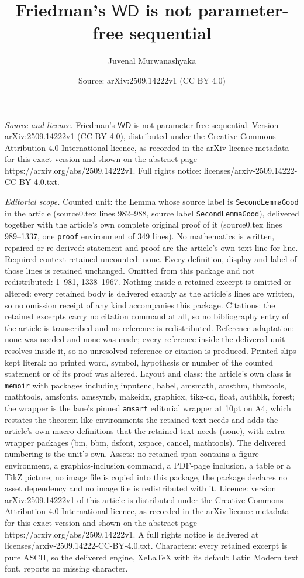 \documentclass[10pt,a4paper]{amsart}
\title[Friedman's $ \mathsf{WD} $ is not parameter-free sequential]{Friedman's $ \mathsf{WD} $ is not parameter-free sequential}
\author{Juvenal Murwanashyaka}
\date{Source: arXiv:2509.14222v1 (CC BY 4.0)}
\begin{document}
\maketitle

\noindent\emph{Source and licence.} Friedman's $ \mathsf{WD} $ is not parameter-free sequential. Version arXiv:2509.14222v1 (CC BY 4.0), distributed under the Creative Commons Attribution 4.0 International licence, as recorded in the arXiv licence metadata for this exact version and shown on the abstract page https://arxiv.org/abs/2509.14222v1. Full rights notice: licenses/arxiv-2509.14222-CC-BY-4.0.txt.\par\smallskip

\noindent\textit{Editorial scope.} Counted unit: the Lemma whose source label is \texttt{SecondLemmaGood} in the article (source0.tex lines 982--988, source label \texttt{SecondLemmaGood}), delivered together with the article's own complete original proof of it (source0.tex lines 989--1337, one \texttt{proof} environment of 349 lines). No mathematics is written, repaired or re-derived: statement and proof are the article's own text line for line. Required context retained uncounted: none. Every definition, display and label of those lines is retained unchanged. Omitted from this package and not redistributed: 1--981, 1338--1967. Nothing inside a retained excerpt is omitted or altered: every retained body is delivered exactly as the article's lines are written, so no omission receipt of any kind accompanies this package. Citations: the retained excerpts carry no citation command at all, so no bibliography entry of the article is transcribed and no reference is redistributed. Reference adaptation: none was needed and none was made; every reference inside the delivered unit resolves inside it, so no unresolved reference or citation is produced. Printed slips kept literal: no printed word, symbol, hypothesis or number of the counted statement or of its proof was altered. Layout and class: the article's own class is \texttt{memoir} with packages including inputenc, babel, amsmath, amsthm, thmtools, mathtools, amsfonts, amssymb, makeidx, graphicx, tikz-cd, float, authblk, forest; the wrapper is the lane's pinned \texttt{amsart} editorial wrapper at 10pt on A4, which restates the theorem-like environments the retained text needs and adds the article's own macro definitions that the retained text needs (none), with extra wrapper packages (bm, bbm, dsfont, xspace, cancel, mathtools). The delivered numbering is the unit's own. Assets: no retained span contains a figure environment, a graphics-inclusion command, a PDF-page inclusion, a table or a TikZ picture; no image file is copied into this package, the package declares no asset dependency and no image file is redistributed with it. Licence: version arXiv:2509.14222v1 of this article is distributed under the Creative Commons Attribution 4.0 International licence, as recorded in the arXiv licence metadata for this exact version and shown on the abstract page https://arxiv.org/abs/2509.14222v1. A full rights notice is delivered at licenses/arxiv-2509.14222-CC-BY-4.0.txt. Characters: every retained excerpt is pure ASCII, so the delivered engine, XeLaTeX with its default Latin Modern text font, reports no missing character.
\end{document}
